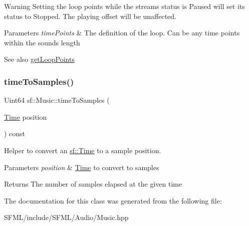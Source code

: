 \begin{DoxyWarning}{Warning}
Setting the loop points while the stream\textquotesingle{}s status is Paused will set its status to Stopped. The playing offset will be unaffected.
\end{DoxyWarning}

\begin{DoxyParams}{Parameters}
{\em time\+Points} & The definition of the loop. Can be any time points within the sound\textquotesingle{}s length\\
\hline
\end{DoxyParams}
\begin{DoxySeeAlso}{See also}
\mbox{\hyperlink{classsf_1_1_music_aae3451cad5c16ee6a6e124e62ed61361}{get\+Loop\+Points}} \begin{DoxyVerb}\end{DoxyVerb}
 
\end{DoxySeeAlso}
\mbox{\label{classsf_1_1_music_a172e5bfd83235c471c96004f93c4bd0d}} 
\subsubsection{\texorpdfstring{timeToSamples()}{timeToSamples()}}
{\footnotesize\ttfamily Uint64 sf\+::\+Music\+::time\+To\+Samples (\begin{DoxyParamCaption}\item[{\mbox{\hyperlink{classsf_1_1_time}{Time}}}]{position }\end{DoxyParamCaption}) const\hspace{0.3cm}{\ttfamily [private]}}



Helper to convert an \mbox{\hyperlink{classsf_1_1_time}{sf\+::\+Time}} to a sample position. 


\begin{DoxyParams}{Parameters}
{\em position} & \mbox{\hyperlink{classsf_1_1_time}{Time}} to convert to samples\\
\hline
\end{DoxyParams}
\begin{DoxyReturn}{Returns}
The number of samples elapsed at the given time \begin{DoxyVerb}\end{DoxyVerb}
 
\end{DoxyReturn}


The documentation for this class was generated from the following file\+:\begin{DoxyCompactItemize}
\item 
S\+F\+M\+L/include/\+S\+F\+M\+L/\+Audio/Music.\+hpp\end{DoxyCompactItemize}
